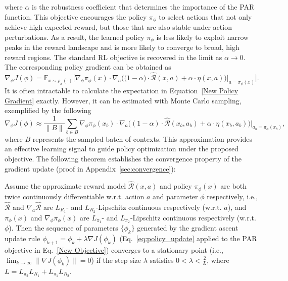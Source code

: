 \documentclass[./dissertation.tex]{subfiles}
\begin{document}
where $\alpha$ is the robustness coefficient that determines the importance of the PAR function. This objective encourages the policy $\pi_\phi$ to select actions that not only achieve high expected reward, but those that are also stable under action perturbations. As a result, the learned policy $\pi_\phi$ is less likely to exploit narrow peaks in the reward landscape and is more likely to converge to broad, high reward regions. The standard RL objective is recovered in the limit as $\alpha \to 0$. The corresponding policy gradient can be obtained as
\begin{equation}
\label{New Policy Gradient}
\nabla_\phi J(\phi) =
\mathbb{E}_{x \sim \rho_x(\cdot)}
\Big[\nabla_\phi \pi_\phi(x) \cdot 
\nabla_a \Big(\big(1-\alpha\big) \cdot \hat{\mathcal{R}}(x,a) + \alpha \cdot \eta(x,a)\Big) \Big|_{a=\pi_\phi(x)} \Big].
\end{equation}
It is often intractable to calculate the expectation in Equation~\ref{New Policy Gradient} exactly. However, it can be estimated with Monte Carlo sampling, exemplified by the following
\begin{equation}
\label{Approximate New Policy Gradient}
\nabla_\phi J(\phi) \approx
\frac{1}{\|B\|} \sum_{b \in B}\nabla_\phi \pi_\phi(x_b) 
\cdot \nabla_a\Big((1-\alpha) \cdot \hat{\mathcal{R}}(x_b,a_b) + \alpha \cdot \eta(x_b,a_b)\Big) \Big|_{a_b=\pi_\phi(x_b)},
\end{equation}
where $B$ represents the sampled batch of contexts. This approximation provides an effective learning signal to guide policy optimization under the proposed objective. The following theorem establishes the convergence property of the gradient update (proof in Appendix~\ref{sec:convergence}):
\begin{theorem}
\label{thm:convergence}
    Assume the approximate reward model $\hat{\mathcal{R}}(x, a)$ and policy $\pi_\phi(x)$ are both twice continuously differentiable w.r.t. action $a$ and parameter $\phi$ respectively, i.e., $\hat{\mathcal{R}}$ and $\nabla_a\hat{\mathcal{R}}$ are $L_{R_1}$- and $L_{R_2}$-Lipschitz continuous respectively (w.r.t. $a$), and $\pi_\phi(x)$ and $\nabla_\phi \pi_\phi(x)$ are $L_{\pi_1}$- and $L_{\pi_2}$-Lipschitz continuous respectively (w.r.t. $\phi$). Then the sequence of parameters $\{\phi_k\}$ generated by the gradient ascent update rule $\phi_{k+1} = \phi_k + \lambda \nabla J(\phi_k)$ (Eq.~\ref{eq:policy_update} applied to the PAR objective in Eq.~\ref{New Objective}) converges to a stationary point (i.e., $\lim_{k \to \infty} \|\nabla J(\phi_k)\| = 0$) if the step size $\lambda$ satisfies $0 < \lambda < \frac{2}{L}$, where $L = L_{\pi_2}L_{R_1} + L_{\pi_1}L_{R_2}$.
\end{theorem}
\end{document}
